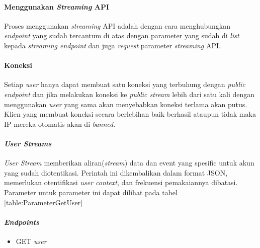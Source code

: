 \paragraph{Menggunakan \textit{Streaming} API}
Proses menggunakan \textit{streaming} API adalah dengan cara menghubungkan \textit{endpoint} yang sudah tercantum di atas dengan parameter yang sudah di \textit{list} kepada \textit{streaming endpoint} dan juga \textit{request} parameter \textit{streaming} API.

\paragraph{Koneksi}
Setiap \textit{user} hanya dapat membuat satu koneksi yang terbuhung dengan \textit{public endpoint} dan jika melakukan koneksi ke \textit{public stream} lebih dari satu kali dengan menggunakan \textit{user} yang sama akan menyebabkan koneksi terlama akan putus. Klien yang membuat koneksi secara berlebihan baik berhasil ataupun tidak maka IP mereka otomatis akan di \textit{banned}.

\paragraph{\textit{User Streams}}
\textit{User Stream} memberikan aliran(\textit{stream}) data dan event yang spesific untuk akun yang sudah diotentikasi. Perintah ini dikembalikan dalam format JSON, memerlukan otentifikasi \textit{user context}, dan frekuensi pemakaiannya dibatasi. Parameter untuk parameter ini dapat dilihat pada tabel \ref{table:ParameterGetUser}


\paragraph{\textit{Endpoints}}
\begin{itemize}
	\item GET \textit{user}
\end{itemize}

